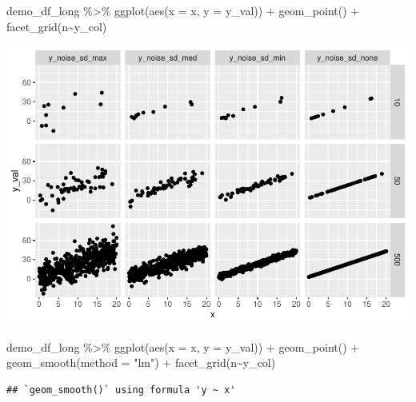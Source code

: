 \documentclass[
]{book}
\newenvironment{Shaded}{\begin{snugshade}}{\end{snugshade}}
\newcommand{\AttributeTok}[1]{\textcolor[rgb]{0.77,0.63,0.00}{#1}}
\newcommand{\FunctionTok}[1]{\textcolor[rgb]{0.00,0.00,0.00}{#1}}
\newcommand{\NormalTok}[1]{#1}
\newcommand{\SpecialCharTok}[1]{\textcolor[rgb]{0.00,0.00,0.00}{#1}}
\newcommand{\StringTok}[1]{\textcolor[rgb]{0.31,0.60,0.02}{#1}}
\begin{document}
\begin{Shaded}
\begin{Highlighting}[]
\NormalTok{demo\_df\_long }\SpecialCharTok{\%\textgreater{}\%} 
  \FunctionTok{ggplot}\NormalTok{(}\FunctionTok{aes}\NormalTok{(}\AttributeTok{x =}\NormalTok{ x, }\AttributeTok{y =}\NormalTok{ y\_val)) }\SpecialCharTok{+}
  \FunctionTok{geom\_point}\NormalTok{() }\SpecialCharTok{+}
  \FunctionTok{facet\_grid}\NormalTok{(n}\SpecialCharTok{\textasciitilde{}}\NormalTok{y\_col)}
\end{Highlighting}
\end{Shaded}

\includegraphics{test_course_notes_files/figure-latex/unnamed-chunk-84-1.pdf}

\begin{Shaded}
\begin{Highlighting}[]
\NormalTok{demo\_df\_long }\SpecialCharTok{\%\textgreater{}\%} 
  \FunctionTok{ggplot}\NormalTok{(}\FunctionTok{aes}\NormalTok{(}\AttributeTok{x =}\NormalTok{ x, }\AttributeTok{y =}\NormalTok{ y\_val)) }\SpecialCharTok{+}
  \FunctionTok{geom\_point}\NormalTok{() }\SpecialCharTok{+}
  \FunctionTok{geom\_smooth}\NormalTok{(}\AttributeTok{method =} \StringTok{"lm"}\NormalTok{) }\SpecialCharTok{+} 
  \FunctionTok{facet\_grid}\NormalTok{(n}\SpecialCharTok{\textasciitilde{}}\NormalTok{y\_col)}
\end{Highlighting}
\end{Shaded}

\begin{verbatim}
## `geom_smooth()` using formula 'y ~ x'
\end{verbatim}
\end{document}
